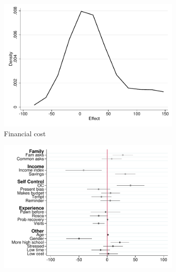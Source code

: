 \documentclass[11pt]{article}
\begin{document}
\begin{figure}[H]
    \caption{Heterogeneous Treatment Effect - Choice/Fee}
    \label{heterogeneous_te_4}
    \begin{center}
    \begin{subfigure}{0.4\textwidth}
        \caption{Financial cost}
        \centering
        \includegraphics[width=\textwidth]{Figuras/he_dist_fc_admin_disc_pro_4.pdf}
    \end{subfigure}
    \begin{subfigure}{0.4\textwidth}
        \caption*{}
        \centering
        \includegraphics[width=\textwidth]{Figuras/HE/he_int_vertical_fc_admin_disc_pro_4.pdf}
    \end{subfigure}
    

\end{center}
\end{figure}
\end{document}
